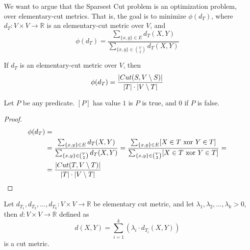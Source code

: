     We want to argue that the Sparsest Cut problem is an optimization problem, over elementary-cut metrics.
    That is, the goal is to minimize $\phi(d_T)$, where $d_T : V \times V \rightarrow \mathbb{R}$ is an elementary-cut metric over $V$, and
    \[ \phi(d_T) = \dfrac{\sum_{\{x,y\} \in E} d_T(X,Y)}{\sum_{\{x,y\} \in \binom{V}{2}} d_T(X,Y)} \]

    \begin{lemma}\label{lemma:metric2}
        If $d_T$ is an elementary-cut metric over $V$, then
        \[ \phi(d_T) = \dfrac{\vert Cut(S, V \setminus S) \vert}{\vert T \vert \cdot \vert V \setminus T \vert} \]
    \end{lemma}

    Let $P$ be any predicate. $[P]$ has value $1$ is $P$ is true, and $0$ if $P$ is false.

    \begin{proof}


        \begin{equation*}
            \begin{split}
                \phi(d_T)   &=\\
                            &= \dfrac{\sum_{\{x,y\} \in E} d_T(X,Y)}{\sum_{\{x,y\} \in \binom{V}{2}} d_T(X,Y)} = \dfrac{\sum_{\{x,y\} \in E} [X \in T \text{ xor } Y \in T]}{\sum_{\{x,y\} \in \binom{V}{2}} [X \in T \text{ xor } Y \in T]} =\\
                            &= \dfrac{\vert Cut(T, V \setminus T) \vert}{\vert T \vert \cdot \vert V \setminus T \vert}
            \end{split}
        \end{equation*}
    \end{proof}

    \begin{definition}
        Let $d_{T_1}, d_{T_2}, \dots, d_{T_k} : V \times V \rightarrow \mathbb{R}$ be elementary cut metric, and let $\lambda_1, \lambda_2, \dots, \lambda_k > 0$, then $d : V \times V \rightarrow \mathbb{R}$ defined as
        \[ d(X,Y) = \sum_{i=1}^{k}(\lambda_i \cdot d_{T_i}(X,Y)) \]
        is a cut metric.
    \end{definition}


